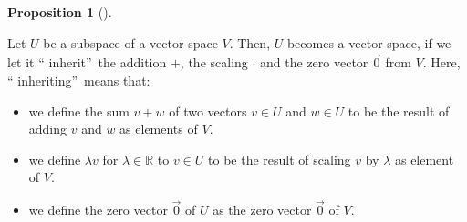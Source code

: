 \documentclass[numbers=enddot,12pt,final,onecolumn,notitlepage]{scrartcl}%
\theoremstyle{definition}
\newtheorem{prop}[theo]{Proposition}
\newenvironment{proposition}[1][]
{\begin{prop}[#1]\begin{leftbar}}
{\end{leftbar}\end{prop}}
\begin{document}
\begin{proposition}
\label{prop.subspace.space}Let $U$ be a subspace of a vector space $V$. Then,
$U$ becomes a vector space, if we let it \textquotedblleft
inherit\textquotedblright\ the addition $+$, the scaling $\cdot$ and the zero
vector $\overrightarrow{0}$ from $V$. Here, \textquotedblleft
inheriting\textquotedblright\ means that:

\begin{itemize}
\item we define the sum $v+w$ of two vectors $v\in U$ and $w\in U$ to be the
result of adding $v$ and $w$ as elements of $V$.

\item we define $\lambda v$ for $\lambda\in\mathbb{R}$ to $v\in U$ to be the
result of scaling $v$ by $\lambda$ as element of $V$.

\item we define the zero vector $\overrightarrow{0}$ of $U$ as the zero vector
$\overrightarrow{0}$ of $V$.
\end{itemize}
\end{proposition}
\end{document}
